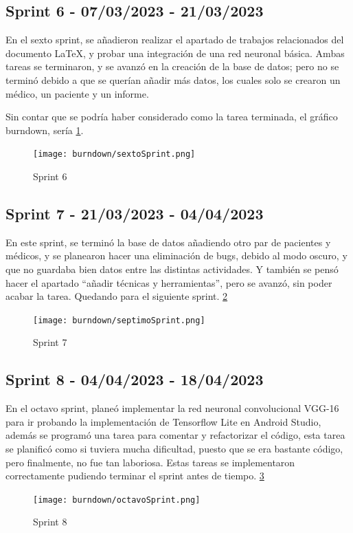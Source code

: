 \subsection{Sprint 6 - 07/03/2023 - 21/03/2023}
En el sexto sprint, se añadieron realizar el apartado de trabajos relacionados del documento LaTeX, y probar una integración de una red neuronal básica.
Ambas tareas se terminaron, y se avanzó en la creación de la base de datos; pero no se terminó debido a que se querían añadir más datos, los cuales solo se crearon un médico, un paciente y un informe.

Sin contar que se podría haber considerado como la tarea terminada, el gráfico burndown, sería \ref{fig:Sprint6}.
\begin{figure}[!ht]
         \centering
         \texttt{[image: burndown/sextoSprint.png]}
         \caption{Sprint 6}
         \label{fig:Sprint6}
\end{figure}

\subsection{Sprint 7 - 21/03/2023 - 04/04/2023}
En este sprint, se terminó la base de datos añadiendo otro par de pacientes y médicos, y se planearon hacer una eliminación de bugs, debido al modo oscuro, y que no guardaba bien datos entre las distintas actividades. Y también se pensó hacer el apartado ``añadir técnicas y herramientas'', pero se avanzó, sin poder acabar la tarea. Quedando para el siguiente sprint.
\ref{fig:Sprint7}
\begin{figure}[!ht]
         \centering
         \texttt{[image: burndown/septimoSprint.png]}
         \caption{Sprint 7}
         \label{fig:Sprint7}
\end{figure}


\subsection{Sprint 8 - 04/04/2023 - 18/04/2023}

En el octavo sprint, planeó implementar la red neuronal convolucional VGG-16 para ir probando la implementación de Tensorflow Lite en Android Studio, además se programó  una tarea para comentar y refactorizar el código, esta tarea se planificó como si tuviera mucha dificultad, puesto que se era bastante código, pero finalmente, no fue tan laboriosa. Estas tareas se implementaron correctamente pudiendo terminar el sprint antes de tiempo. \ref{fig:Sprint8}
\begin{figure}[!ht]
         \centering
         \texttt{[image: burndown/octavoSprint.png]}
         \caption{Sprint 8}
         \label{fig:Sprint8}
\end{figure}


